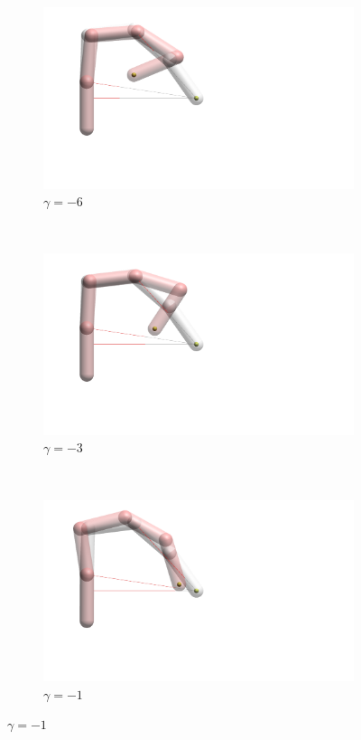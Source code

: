 \begin{figure}[h]
    \centering
    \begin{subfigure}[b]{.3\textwidth}
        \includegraphics[width=\textwidth]{Figures/distortions/distortions-6.png}
        \caption{$\gamma = -6$}
    \end{subfigure}
    ~
    \begin{subfigure}[b]{.3\textwidth}
        \includegraphics[width=\textwidth]{Figures/distortions/distortions-3.png}
        \caption{$\gamma = -3$}
    \end{subfigure}
    ~
    \begin{subfigure}[b]{.3\textwidth}
        \includegraphics[width=\textwidth]{Figures/distortions/distortions-1.png}
        \caption{$\gamma = -1$}
    \end{subfigure}



\end{figure}
